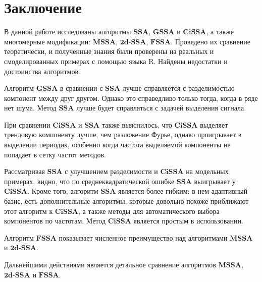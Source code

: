 \documentclass[a4paper, 11pt]{article}
\newcommand{\SSA}{\textbf{SSA}}
\newcommand{\GSSA}{\textbf{GSSA}}
\newcommand{\CISSA}{\textbf{CiSSA}}
\newcommand{\MSSA}{\textbf{MSSA}}
\newcommand{\FSSA}{\textbf{FSSA}}
\newcommand{\DSSA}{\textbf{2d-SSA}}
\begin{document}
\newpage




\section{Заключение}
\label{sec:concl}


В данной работе исследованы алгоритмы $\SSA$, $\GSSA$ и $\CISSA$, а также многомерные модификации: $\MSSA$, $\DSSA$, $\FSSA$. Проведено их сравнение теоретически, и полученные
знания были проверены на реальных и смоделированных примерах с помощью языка R. Найдены недостатки и достоинства алгоритмов.

Алгоритм $\GSSA$ в сравнении с $\SSA$ лучше справляется с разделимостью  компонент между друг другом. Однако это справедливо только тогда, когда в ряде нет шума. Метод $\SSA$ лучше будет справляться с задачей выделения сигнала.

При сравнении $\CISSA$ и $\SSA$ также выяснилось, что $\CISSA$ выделяет трендовую компоненту лучше, чем разложение Фурье, однако проигрывает в выделении периодик, особенно когда частота выделяемой компоненты не попадает в сетку частот методов.

Рассматривая $\SSA$ с улучшением разделимости и $\CISSA$ на модельных примерах, видно, что по среднеквадратической ошибке $\SSA$ выигрывает у $\CISSA$.
Кроме того, алгоритм $\SSA$ является более гибким: в нем адаптивный базис, есть дополнительные алгоритмы, которые довольно похоже приближают этот алгоритм к $\CISSA$, а также методы для автоматического выбора компонентов по частотам. Метод $\CISSA$ является простым в использовании.

Алгоритм $\FSSA$ показывает численное преимущество над алгоритмами $\MSSA$ и $\DSSA$.


Дальнейшими действиями является детальное сравнение алгоритмов $\MSSA$, $\DSSA$ и $\FSSA$.


\newpage



\end{document}
